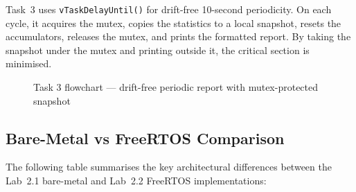 Task~3 uses \texttt{vTaskDelayUntil()} for drift-free 10-second periodicity. On each cycle, it acquires the mutex, copies the statistics to a local snapshot, resets the accumulators, releases the mutex, and prints the formatted report. By taking the snapshot under the mutex and printing outside it, the critical section is minimised.

\begin{figure}[H]
\centering
{}
\caption{Task 3 flowchart --- drift-free periodic report with mutex-protected snapshot}
\label{fig:task3_flowchart}
\end{figure}

\subsection{Bare-Metal vs FreeRTOS Comparison}

The following table summarises the key architectural differences between the Lab~2.1 bare-metal and Lab~2.2 FreeRTOS implementations:

